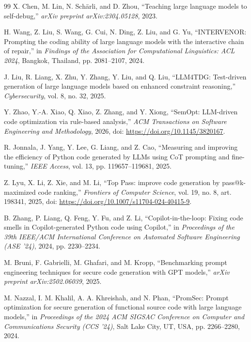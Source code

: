 \documentclass[10pt,a4paper]{article}
\begin{document}
\begin{thebibliography}{99}
X. Chen, M. Lin, N. Sch{\"a}rli, and D. Zhou, ``Teaching large language models to self-debug,'' \textit{arXiv preprint arXiv:2304.05128}, 2023.

H. Wang, Z. Liu, S. Wang, G. Cui, N. Ding, Z. Liu, and G. Yu, ``INTERVENOR: Prompting the coding ability of large language models with the interactive chain of repair,'' in \textit{Findings of the Association for Computational Linguistics: ACL 2024}, Bangkok, Thailand, pp. 2081--2107, 2024.

J. Liu, R. Liang, X. Zhu, Y. Zhang, Y. Liu, and Q. Liu, ``LLM4TDG: Test-driven generation of large language models based on enhanced constraint reasoning,'' \textit{Cybersecurity}, vol. 8, no. 32, 2025.

Y. Zhao, Y.-A. Xiao, Q. Xiao, Z. Zhang, and Y. Xiong, ``SemOpt: LLM-driven code optimization via rule-based analysis,'' \textit{ACM Transactions on Software Engineering and Methodology}, 2026, doi: \url{https://doi.org/10.1145/3820167}.

R. Jonnala, J. Yang, Y. Lee, G. Liang, and Z. Cao, ``Measuring and improving the efficiency of Python code generated by LLMs using CoT prompting and fine-tuning,'' \textit{IEEE Access}, vol. 13, pp. 119657--119681, 2025.

Z. Lyu, X. Li, Z. Xie, and M. Li, ``Top Pass: improve code generation by pass@k-maximized code ranking,'' \textit{Frontiers of Computer Science}, vol. 19, no. 8, art. 198341, 2025, doi: \url{https://doi.org/10.1007/s11704-024-40415-9}.

B. Zhang, P. Liang, Q. Feng, Y. Fu, and Z. Li, ``Copilot-in-the-loop: Fixing code smells in Copilot-generated Python code using Copilot,'' in \textit{Proceedings of the 39th IEEE/ACM International Conference on Automated Software Engineering (ASE '24)}, 2024, pp. 2230--2234.

M. Bruni, F. Gabrielli, M. Ghafari, and M. Kropp, ``Benchmarking prompt engineering techniques for secure code generation with GPT models,'' \textit{arXiv preprint arXiv:2502.06039}, 2025.

M. Nazzal, I. M. Khalil, A. A. Khreishah, and N. Phan, ``PromSec: Prompt optimization for secure generation of functional source code with large language models,'' in \textit{Proceedings of the 2024 ACM SIGSAC Conference on Computer and Communications Security (CCS '24)}, Salt Lake City, UT, USA, pp. 2266--2280, 2024.


\end{thebibliography}
\end{document}
